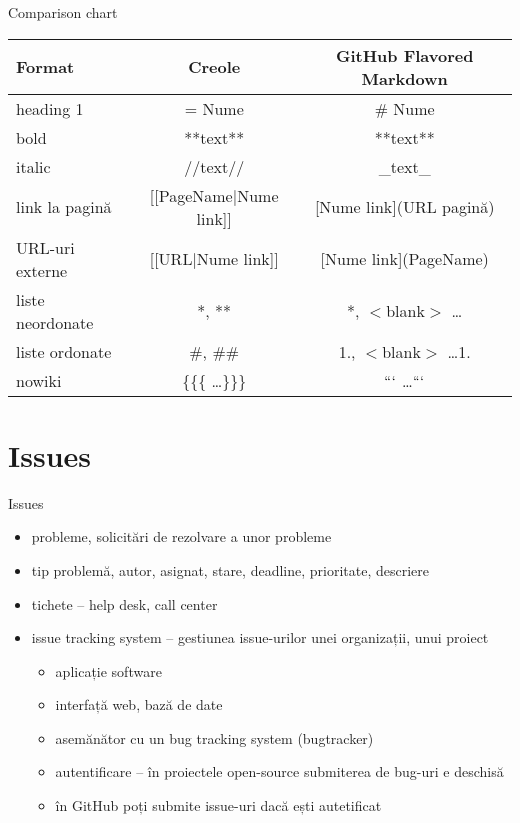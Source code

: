 \documentclass{beamer}
\begin{document}
\begin{frame}{Comparison chart}
  \begin{center}
    \begin{tabular}{@{}lcc@{}}
      \toprule
      \textbf{Format} & \textbf{Creole} & \textbf{GitHub Flavored Markdown} \\
      \midrule
      heading 1 & = Nume & \# Nume \\
      bold & **text** & **text** \\
      italic & //text// & \_text\_ \\
      link la pagină & [[PageName$|$Nume link]] & [Nume link](URL pagină) \\
      URL-uri externe & [[URL$|$Nume link]] &  [Nume link](PageName) \\
      liste neordonate & *, ** & *, $<$blank$>$ \ldots * \\
      liste ordonate & \#, \#\# & 1., $<$blank$>$ \ldots 1. \\
      nowiki & \{\{\{ \ldots \}\}\} & $```$ \ldots $```$ \\
      \bottomrule
    \end{tabular}
  \end{center}
\end{frame}

\section{Issues}

\begin{frame}{Issues}
  \begin{itemize}
    \item probleme, solicitări de rezolvare a unor probleme
    \item tip problemă, autor, asignat, stare, deadline, prioritate,
descriere
    \item tichete -- help desk, call center
    \item issue tracking system -- gestiunea issue-urilor unei
organizații, unui proiect
      \begin{itemize}
        \item aplicație software
        \item interfață web, bază de date
        \item asemănător cu un bug tracking system (bugtracker)
        \item autentificare -- în proiectele open-source submiterea de
bug-uri e deschisă
        \item în GitHub poți submite issue-uri dacă ești autetificat
      \end{itemize}
  \end{itemize}
\end{frame}
\end{document}
